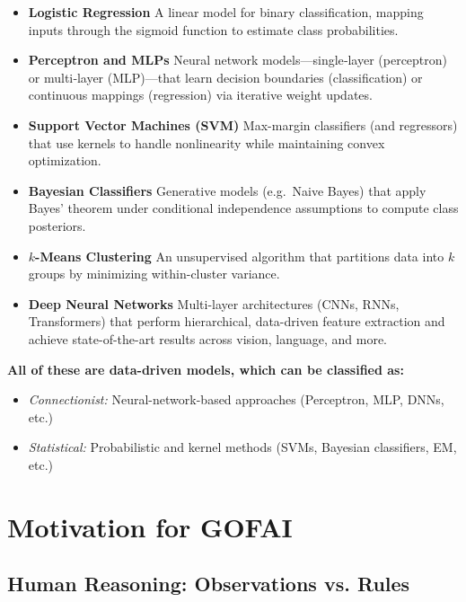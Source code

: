\documentclass[12pt]{article}
\begin{document}
\begin{itemize}
  \item \textbf{Logistic Regression}  
    A linear model for binary classification, mapping inputs through the sigmoid function to estimate class probabilities.
  \item \textbf{Perceptron and MLPs}  
    Neural network models—single‐layer (perceptron) or multi‐layer (MLP)—that learn decision boundaries (classification) or continuous mappings (regression) via iterative weight updates.
  \item \textbf{Support Vector Machines (SVM)}  
    Max-margin classifiers (and regressors) that use kernels to handle nonlinearity while maintaining convex optimization.
  \item \textbf{Bayesian Classifiers}  
    Generative models (e.g.\ Naive Bayes) that apply Bayes’ theorem under conditional independence assumptions to compute class posteriors.
  \item \textbf{\(k\)-Means Clustering}  
    An unsupervised algorithm that partitions data into \(k\) groups by minimizing within-cluster variance.
  \item \textbf{Deep Neural Networks}  
    Multi-layer architectures (CNNs, RNNs, Transformers) that perform hierarchical, data-driven feature extraction and achieve state-of-the-art results across vision, language, and more.
\end{itemize}

\colorbox{red!10}{%
  \parbox{\textwidth}{%
    \textbf{All of these are data-driven models, which can be classified as:}
    \begin{itemize}
      \item \emph{Connectionist:} Neural-network-based approaches (Perceptron, MLP, DNNs, etc.)  
      \item \emph{Statistical:} Probabilistic and kernel methods (SVMs, Bayesian classifiers, EM, etc.)
    \end{itemize}
  }%
}


\section{Motivation for GOFAI}

\subsection{Human Reasoning: Observations vs. Rules}
\end{document}
